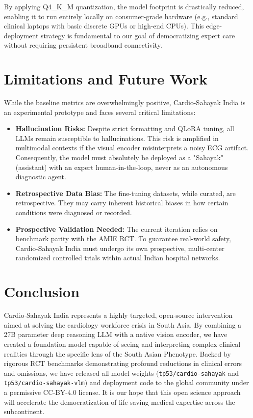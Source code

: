 \documentclass[11pt,a4paper]{article}
\begin{document}
By applying Q4\_K\_M quantization, the model footprint is drastically reduced, enabling it to run entirely locally on consumer-grade hardware (e.g., standard clinical laptops with basic discrete GPUs or high-end CPUs). This edge-deployment strategy is fundamental to our goal of democratizing expert care without requiring persistent broadband connectivity.

\section{Limitations and Future Work}

While the baseline metrics are overwhelmingly positive, Cardio-Sahayak India is an experimental prototype and faces several critical limitations:
\begin{itemize}
    \item \textbf{Hallucination Risks:} Despite strict formatting and QLoRA tuning, all LLMs remain susceptible to hallucinations. This risk is amplified in multimodal contexts if the visual encoder misinterprets a noisy ECG artifact. Consequently, the model must absolutely be deployed as a "Sahayak" (assistant) with an expert human-in-the-loop, never as an autonomous diagnostic agent.
    \item \textbf{Retrospective Data Bias:} The fine-tuning datasets, while curated, are retrospective. They may carry inherent historical biases in how certain conditions were diagnosed or recorded.
    \item \textbf{Prospective Validation Needed:} The current iteration relies on benchmark parity with the AMIE RCT. To guarantee real-world safety, Cardio-Sahayak India must undergo its own prospective, multi-center randomized controlled trials within actual Indian hospital networks.
\end{itemize}

\section{Conclusion}

Cardio-Sahayak India represents a highly targeted, open-source intervention aimed at solving the cardiology workforce crisis in South Asia. By combining a 27B parameter deep reasoning LLM with a native vision encoder, we have created a foundation model capable of seeing and interpreting complex clinical realities through the specific lens of the South Asian Phenotype. Backed by rigorous RCT benchmarks demonstrating profound reductions in clinical errors and omissions, we have released all model weights (\texttt{tp53/cardio-sahayak} and \texttt{tp53/cardio-sahayak-vlm}) and deployment code to the global community under a permissive CC-BY-4.0 license. It is our hope that this open science approach will accelerate the democratization of life-saving medical expertise across the subcontinent.
\end{document}

